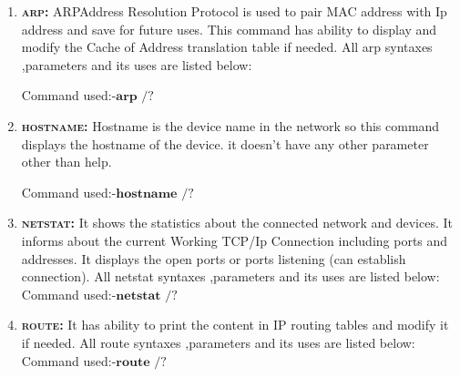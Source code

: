 \documentclass[a4paper,12pt]{article}
\newcommand{\SYN}[1]{\quad Command used:-$\textbf{#1}$}
\begin{document}
\begin{enumerate}
          \SYN{tracert /?}


    \item \textsc {\bfseries {arp:}}
          ARP{Address Resolution Protocol} is used to pair MAC address with Ip address and save for future uses.
          This command has ability to display and modify the Cache of Address translation table if needed.
          All arp syntaxes ,parameters and its uses are listed below:

          \SYN{arp /?}


    \item \textsc {\bfseries {hostname:}}
          Hostname is the device name in the network so this command displays the hostname of the device.
          it doesn't  have any other parameter other than help.

          \SYN{hostname /?}



    \item \textsc {\bfseries {netstat:}}
          It shows the statistics about the connected network and devices.
          It informs about the current Working TCP/Ip  Connection including ports and addresses.
          It displays the open ports or ports listening (can establish connection).
          All netstat syntaxes ,parameters and its uses are listed below:
          \SYN{netstat /?}


    \item \textsc {\bfseries{route:}}
          It has ability to print the content in IP routing tables and modify it if needed.
          All route syntaxes ,parameters and its uses are listed below:\\
          \SYN{route /?}


\end{enumerate}

\end{document}
